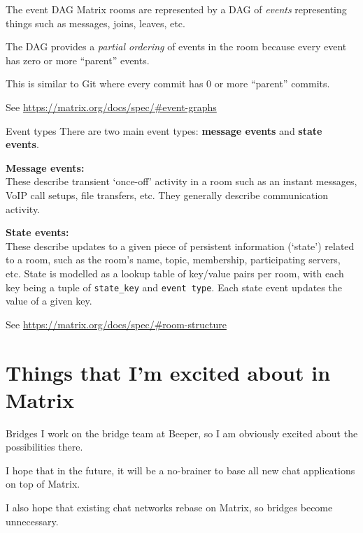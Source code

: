 \documentclass{acm}
\begin{document}
\begin{frame}{The event DAG}
    Matrix rooms are represented by a DAG of \textit{events} representing things
    such as messages, joins, leaves, etc.
    \pause

    The DAG provides a \textit{partial ordering} of events in the room because
    every event has zero or more ``parent'' events.
    \pause

    This is similar to Git where every commit has 0 or more ``parent'' commits.

    \vspace{1cm}
    {
        \tiny
        See \url{https://matrix.org/docs/spec/\#event-graphs}
    }
\end{frame}

\begin{frame}{Event types}
    There are two main event types: \textbf{message events} and \textbf{state
    events}.
    \pause

    \textbf{Message events:} \\
    These describe transient `once-off' activity in a room such as an instant
    messages, VoIP call setups, file transfers, etc. They generally describe
    communication activity.
    \pause

    \textbf{State events:} \\
    These describe updates to a given piece of persistent information (`state')
    related to a room, such as the room's name, topic, membership, participating
    servers, etc. State is modelled as a lookup table of key/value pairs per
    room, with each key being a tuple of \texttt{state\_key} and \texttt{event
    type}. Each state event updates the value of a given key.

    {
        \tiny
        See \url{https://matrix.org/docs/spec/\#room-structure}
    }
\end{frame}

\section{Things that I'm excited about in Matrix}

\begin{frame}{Bridges}
    I work on the bridge team at Beeper, so I am obviously excited about the
    possibilities there.
    \pause

    I hope that in the future, it will be a no-brainer to base all new chat
    applications on top of Matrix.

    I also hope that existing chat networks rebase on Matrix, so bridges become
    unnecessary.
\end{frame}
\end{document}
